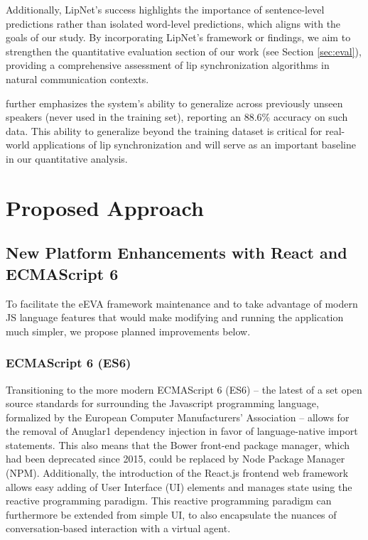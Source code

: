 \documentclass[12pt]{article}
\begin{document}
Additionally, LipNet's success highlights the importance of sentence-level predictions rather than isolated word-level predictions, which aligns with the goals of our study. By incorporating LipNet's framework or findings, we aim to strengthen the quantitative evaluation section of our work (see Section \ref{sec:eval}), providing a comprehensive assessment of lip synchronization algorithms in natural communication contexts.

\cite{assael2016lipnet} further emphasizes the system's ability to generalize across previously unseen speakers (never used in the training set), reporting an 88.6\% accuracy on such data. This ability to generalize beyond the training dataset is critical for real-world applications of lip synchronization and will serve as an important baseline in our quantitative analysis.


\section{Proposed Approach}
\label{sec:approach}

\subsection{New Platform Enhancements with React and ECMAScript 6}

To facilitate the eEVA framework maintenance  and to take advantage of modern JS language features that would make modifying and running the application much simpler, we propose planned improvements below. 

\subsubsection{ECMAScript 6 (ES6)}

Transitioning to the more modern ECMAScript 6 (ES6) -- the latest of a set open source standards for surrounding the Javascript programming language, formalized by the European Computer Manufacturers' Association\cite{ECMA2015} -- allows for the removal of Anuglar1 dependency injection in favor of language-native import statements\cite{ECMA2015}\cite{Mozilla2021}\cite{Rauschmayer2015}. This also means that the Bower front-end package manager, which had been deprecated since 2015, could be replaced by Node Package Manager (NPM). Additionally, the introduction of the React.js frontend web framework allows easy adding of User Interface (UI) elements and manages state using the reactive programming paradigm. This reactive programming paradigm can  furthermore be extended from simple UI, to also encapsulate the nuances of conversation-based interaction with a virtual agent.
\end{document}
